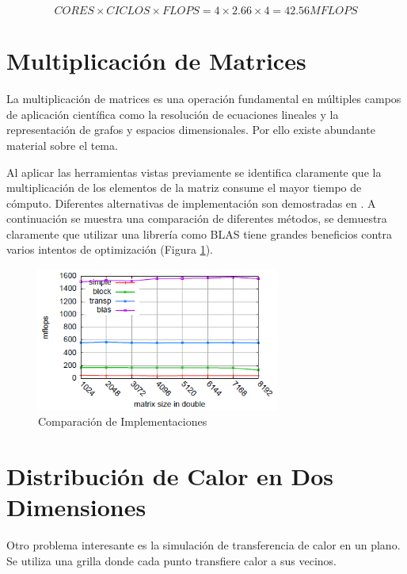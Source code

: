 \documentclass[a4paper]{report}
\begin{document}
\begin{equation}
\label{eq:flops}
CORES \times CICLOS \times FLOPS = 4 \times 2.66 \times 4 = 42.56 MFLOPS
\end{equation}

\section{Multiplicación de Matrices}

La multiplicación de matrices es una operación fundamental en múltiples
campos de aplicación científica como la resolución de ecuaciones
lineales y la representación de grafos y espacios dimensionales. Por ello
existe abundante material sobre el tema. 

{\small  }

Al aplicar las herramientas vistas previamente se identifica claramente que la multiplicación de los elementos de la matriz consume el
mayor tiempo de cómputo. Diferentes alternativas de implementación son demostradas en \cite{mm-tool}. 
A continuación se muestra una comparación de diferentes métodos,
se demuestra claramente que utilizar una librería como BLAS tiene grandes beneficios contra varios intentos de optimización (Figura \ref{fig:mm}).

\begin{figure}[H]
\label{fig:mm}
\begin{center}
\includegraphics[width=8cm]{mm.png}
\caption{Comparación de Implementaciones}
\end{center}
\end{figure}

\section{Distribución de Calor en Dos Dimensiones}

Otro problema interesante es la simulación de transferencia de calor en un plano.
Se utiliza una grilla donde cada punto transfiere calor a sus vecinos.
\end{document}
